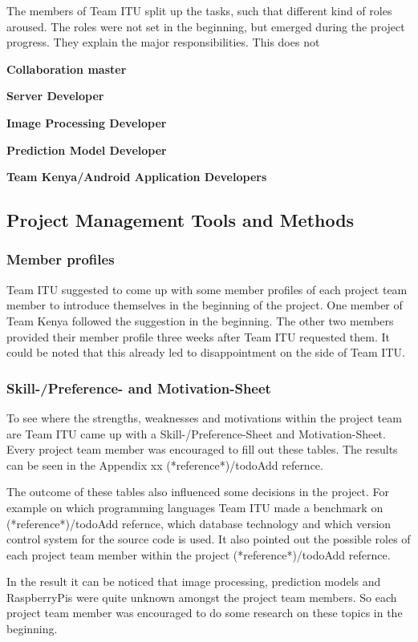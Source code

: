 The members of Team ITU split up the tasks, such that different kind of roles aroused. The roles were not set in the beginning, but emerged during the project progress. They explain the major responsibilities. This does not

\textbf{Collaboration master}

\textbf{Server Developer}

\textbf{Image Processing Developer}

\textbf{Prediction Model Developer}

\textbf{Team Kenya/Android Application Developers}



\subsection{Project Management Tools and Methods}

\subsubsection {Member profiles}
Team ITU suggested to come up with some member profiles of each project team member to introduce themselves in the beginning of the project. One member of Team Kenya followed the suggestion in the beginning. The other two members provided their member profile three weeks after Team ITU requested them. It could be noted that this already led to disappointment on the side of Team ITU.

\subsubsection {Skill-/Preference- and Motivation-Sheet}
To see where the strengths, weaknesses and motivations within the project team are Team ITU came up with a Skill-/Preference-Sheet and Motivation-Sheet. Every project team member was encouraged to fill out these tables. The results can be seen in the Appendix xx (*reference*)/todo{Add refernce}.

The outcome of these tables also influenced some decisions in the project. For example on which programming languages Team ITU made a benchmark on (*reference*)/todo{Add refernce}, which database technology and which version control system for the source code is used. It also pointed out the possible roles of each project team member within the project (*reference*)/todo{Add refernce}.

In the result it can be noticed that image processing, prediction models and RaspberryPis were quite unknown amongst the project team members. So each project team member was encouraged to do some research on these topics in the beginning.

